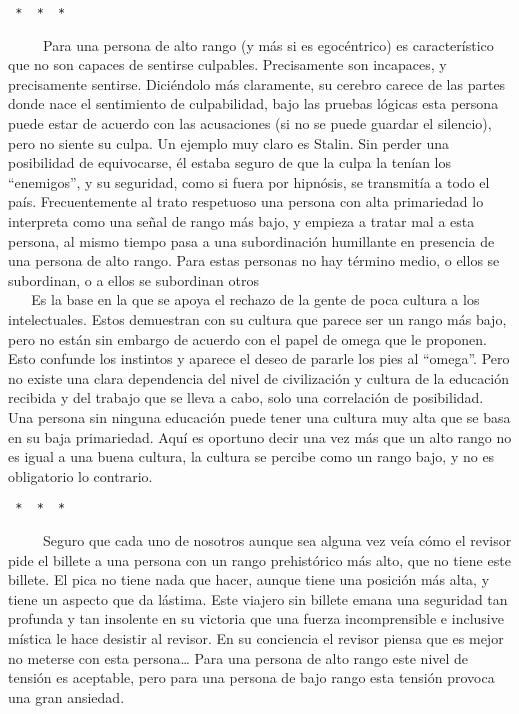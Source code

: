 \begin{verbatim}
 *  *  * 
\end{verbatim}

~ ~ ~ Para una persona de alto rango (y más si es egocéntrico) es
característico que no son capaces de sentirse culpables. Precisamente
son incapaces, y precisamente sentirse. Diciéndolo más claramente, su
cerebro carece de las partes donde nace el sentimiento de culpabilidad,
bajo las pruebas lógicas esta persona puede estar de acuerdo con las
acusaciones (si no se puede guardar el silencio), pero no siente su
culpa. Un ejemplo muy claro es Stalin. Sin perder una posibilidad de
equivocarse, él estaba seguro de que la culpa la tenían los
``enemigos'', y su seguridad, como si fuera por hipnósis, se transmitía
a todo el país. Frecuentemente al trato respetuoso una persona con alta
primariedad lo interpreta como una señal de rango más bajo, y empieza a
tratar mal a esta persona, al mismo tiempo pasa a una subordinación
humillante en presencia de una persona de alto rango. Para estas
personas no hay término medio, o ellos se subordinan, o a ellos se
subordinan otros\\
\hspace*{0.333em} ~ ~ Es la base en la que se apoya el rechazo de la
gente de poca cultura a los intelectuales. Estos demuestran con su
cultura que parece ser un rango más bajo, pero no están sin embargo de
acuerdo con el papel de omega que le proponen. Esto confunde los
instintos y aparece el deseo de pararle los pies al ``omega''. Pero no
existe una clara dependencia del nivel de civilización y cultura de la
educación recibida y del trabajo que se lleva a cabo, solo una
correlación de posibilidad. Una persona sin ninguna educación puede
tener una cultura muy alta que se basa en su baja primariedad. Aquí es
oportuno decir una vez más que un alto rango no es igual a una buena
cultura, la cultura se percibe como un rango bajo, y no es obligatorio
lo contrario.

\begin{verbatim}
 *  *  * 
\end{verbatim}

~ ~ ~ Seguro que cada uno de nosotros aunque sea alguna vez veía cómo el
revisor pide el billete a una persona con un rango prehistórico más
alto, que no tiene este billete. El pica no tiene nada que hacer, aunque
tiene una posición más alta, y tiene un aspecto que da lástima. Este
viajero sin billete emana una seguridad tan profunda y tan insolente en
su victoria que una fuerza incomprensible e inclusive mística le hace
desistir al revisor. En su conciencia el revisor piensa que es mejor no
meterse con esta persona\ldots{} Para una persona de alto rango este
nivel de tensión es aceptable, pero para una persona de bajo rango esta
tensión provoca una gran ansiedad.

